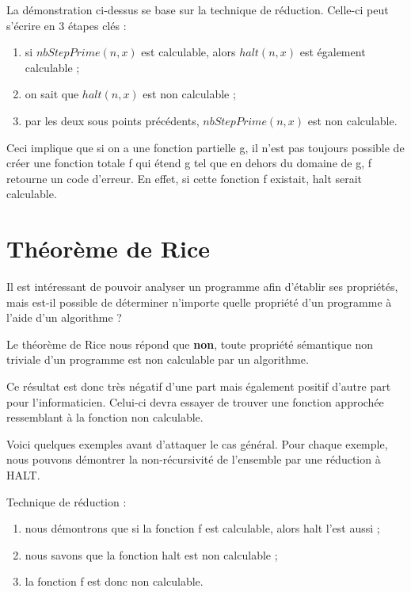 \begin{myrem}
La démonstration ci-dessus se base sur la technique de réduction. Celle-ci peut s'écrire en 3 étapes clés : 
\begin{enumerate}
    \item si $nbStepPrime(n,x)$ est calculable, alors $halt(n,x)$ est également calculable ;
    \item on sait que $halt(n,x)$ est non calculable ;
    \item par les deux sous points précédents, $nbStepPrime(n,x)$ est non calculable.
\end{enumerate}
\end{myrem}

\begin{myrem}
	Ceci implique que si on a une fonction partielle g, il n'est pas
	toujours possible de créer une fonction totale f qui étend g
	tel que en dehors du domaine de g, f retourne un code d'erreur.  En effet, si cette fonction f existait, halt serait calculable.
\end{myrem}


\section{Théorème de Rice}
\label{sub:theoreme_de_rice}

Il est intéressant de pouvoir analyser un programme afin d'établir ses propriétés, mais est-il possible de déterminer n'importe quelle propriété d'un programme à l'aide d'un algorithme ?

Le théorème de Rice nous répond que \textbf{non}, toute propriété sémantique non triviale d'un programme est non calculable par un algorithme.

Ce résultat est donc très négatif d'une part mais également positif d'autre part pour l'informaticien. Celui-ci devra essayer de trouver une fonction approchée ressemblant à la fonction non calculable.


Voici quelques exemples avant d'attaquer le cas général. Pour chaque exemple, nous pouvons démontrer la non-récursivité de l'ensemble par une réduction à HALT.

Technique de réduction : 
\begin{enumerate}
    \item nous démontrons que si la fonction f est calculable, alors halt l'est aussi ;
    \item nous savons que la fonction halt est non calculable ;
    \item la fonction f est donc non calculable.
\end{enumerate}

